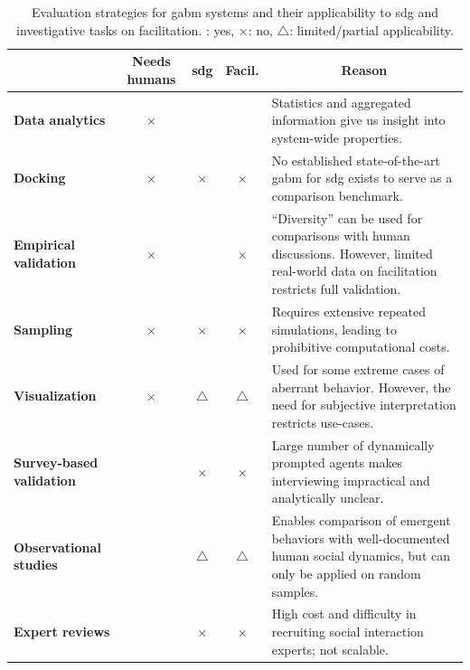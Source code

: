 \begin{table}[h	t]
	\centering
	\small
	\begin{tabular}{>{\bfseries}p{3cm} c c c p{5cm}}
		\toprule
		\multicolumn{1}{c}{\textbf{Name}} & 
		\multicolumn{1}{c}{\textbf{Needs humans}} & 
		\multicolumn{1}{c}{\textbf{\ac{sdg}}} & 
		\multicolumn{1}{c}{\textbf{Facil.}} & 
		\multicolumn{1}{c}{\textbf{Reason}} \\
		\midrule
		Data analytics & $\times$ & \checkmark & \checkmark & Statistics and aggregated information give us insight into system-wide properties. \\
		
		Docking & $\times$ & $\times$ &  $\times$ & No established state-of-the-art \ac{gabm} for \ac{sdg} exists to serve as a comparison benchmark. \\
		
		Empirical validation & $\times$ & \checkmark & $\times$ &  ``Diversity'' can be used for comparisons with human discussions. However, limited real-world data on facilitation restricts full validation. \\
		
		Sampling & $\times$ & $\times$ & $\times$ & Requires extensive repeated simulations, leading to prohibitive computational costs. \\
		
		Visualization & $\times$ & $\triangle$ & $\triangle$ & Used for some extreme cases of aberrant behavior. However, the need for subjective interpretation restricts use-cases.\\
		
		Survey-based validation & \checkmark & $\times$ &  $\times$ & Large number of dynamically prompted agents makes interviewing impractical and analytically unclear. \\
		
		Observational studies & \checkmark & $\triangle$ &$\triangle$ & Enables comparison of emergent behaviors with well-documented human social dynamics, but can only be applied on random samples. \\
		
		Expert reviews & \checkmark & $\times$ & $\times$ & High cost and difficulty in recruiting social interaction experts; not scalable. \\
		\bottomrule
	\end{tabular}
	\caption{Evaluation strategies for \ac{gabm} systems and their applicability to \ac{sdg} and investigative tasks on facilitation. \checkmark: yes, $\times$: no, $\triangle$: limited/partial applicability.}
	\label{tab:evaluation_sdg}
\end{table}


